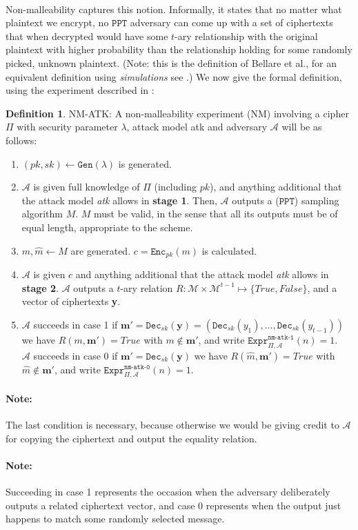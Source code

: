 \documentclass{article}
\theoremstyle{definition}
\newtheorem{definition}{Definition}[section]
\newcommand{\Enc}{\texttt{Enc}}
\newcommand{\Dec}{\texttt{Dec}}
\newcommand{\Gen}{\texttt{Gen}}
\newcommand{\M}{\mathcal{M}}
\newcommand{\A}{\mathcal{A}}
\newcommand{\PPT}{\texttt{PPT}}
\newcommand{\Expr}[2]{\texttt{Expr}^{\texttt{#1}}_{#2}}
\begin{document}
\paragraph{} Non-malleability captures this notion. Informally, it states that
no matter what plaintext we encrypt, no $\PPT$ adversary can come up with a set
of ciphertexts that when decrypted would have some $t$-ary relationship with the
original plaintext with higher probability than the relationship holding for
some randomly picked, unknown plaintext. (Note: this is the definition of Bellare et al., for an
equivalent definition using \textit{simulations} see
\cite{dolev2003nonmalleable}.) We now give the formal definition, using the
experiment described in \cite{bellaresecurityrelations}:
\begin{definition}{NM-ATK:}
  A non-malleability experiment (NM) involving a cipher $\Pi$ with security
  parameter $\lambda$, attack model atk and adversary $\A$ will be as follows:
  \begin{enumerate}
    \item $(pk, sk) \leftarrow \Gen(\lambda)$ is generated.
    \item $\A$ is given full knowledge of $\Pi$ (including $pk$), and anything additional that
      the attack model \textit{atk} allows in \textbf{stage 1}. Then, $\A$
      outputs a ($\PPT$) sampling algorithm $M$. $M$ must be valid, in the sense
      that all its outputs must be of equal length, appropriate to the scheme.
    \item $m, \hat{m} \leftarrow M$ are generated. $c = \Enc_{pk}(m)$ is calculated.
    \item $\A$ is given $c$ and anything additional that the attack model
      \textit{atk} allows in \textbf{stage 2}. $\A$ outputs a $t$-ary relation
      $R:\M \times \M^{t-1} \mapsto \{True, False\}$, and a vector of
      ciphertexts \textbf{y}.
    \item $\A$ succeeds in case 1 if $\textbf{m}' = \Dec_{sk}(\textbf{y}) = (\Dec_{sk}(y_1),
      \hdots,\Dec_{sk}(y_{t-1}))$ we have $R(m, \textbf{m}') = True$ with $m 
      \not\in \textbf{m}'$, and write $\Expr{nm-atk-1}{\Pi, \A}(n) = 1$. \\
      $\A$ succeeds in case 0 if $\textbf{m}' = \Dec_{sk}(\textbf{y})$ we have
      $R(\hat{m}, \textbf{m}') = True$ with $\hat{m} 
      \not\in \textbf{m}'$, and write $\Expr{nm-atk-0}{\Pi, \A}(n) = 1$. \\

  \end{enumerate}
  \paragraph{Note:} The last condition is necessary, because otherwise we would
  be giving credit to $\A$ for copying the ciphertext and output the equality relation.
  \paragraph{Note:} Succeeding in case 1 represents the occasion when the
  adversary deliberately outputs a related ciphertext vector, and case 0
  represents when the output just happens to match some randomly selected message.
\end{definition}
\end{document}
